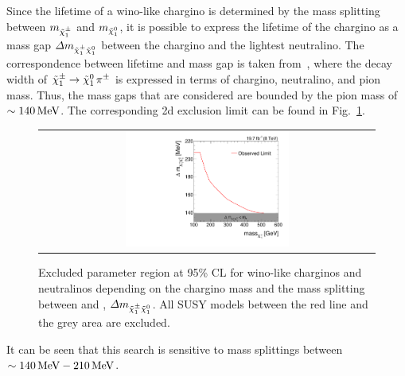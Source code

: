 Since the lifetime of a wino-like chargino is determined by the mass splitting between $m_{\tilde{\chi}^{\pm}_{1}}$ and $m_{\tilde{\chi}^{0}_{1}}$, 
it is possible to express the lifetime of the chargino as a mass gap $\Delta m_{\tilde{\chi}^{\pm}_{1}\tilde{\chi}^{0}_{1}}$ between the chargino and the lightest neutralino.
The correspondence between lifetime and mass gap is taken from~\cite{bib:MassSplitting_Drees}, where the decay width of $\tilde{\chi}^{\pm}_{1} \rightarrow \tilde{\chi}^{0}_{1}\, \pi^{\pm}$ is expressed in terms of chargino, neutralino, and pion mass.
Thus, the mass gaps that are considered are bounded by the pion mass of $\sim140\,\text{Me}\kern-0.06667em\text{V}$.
The corresponding 2d exclusion limit can be found in Fig.~\ref{fig:DeltaMLimit2d}.
\begin{figure}[!h]
  \centering 
  \begin{tabular}{c}
    \includegraphics[width=0.5\textwidth]{figures/analysis/Interpretation/MassSplittingLimitPlot.pdf} 
  \end{tabular}
  \caption{Excluded parameter region at 95\% CL for wino-like charginos and neutralinos depending on the chargino mass and the mass splitting between \chipm and \chiO, $\Delta m_{\tilde{\chi}^{\pm}_{1}\tilde{\chi}^{0}_{1}}$.
          All SUSY models between the red line and the grey area are excluded.}
  \label{fig:DeltaMLimit2d}
\end{figure} 
It can be seen that this search is sensitive to mass splittings between $\sim 140\,\text{Me}\kern-0.06667em\text{V}-210\,\text{Me}\kern-0.06667em\text{V}$.\\

\FloatBarrier
